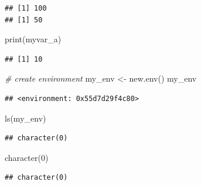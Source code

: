 \documentclass[
]{book}
\newenvironment{Shaded}{\begin{snugshade}}{\end{snugshade}}
\newcommand{\AttributeTok}[1]{\textcolor[rgb]{0.77,0.63,0.00}{#1}}
\newcommand{\CommentTok}[1]{\textcolor[rgb]{0.56,0.35,0.01}{\textit{#1}}}
\newcommand{\DecValTok}[1]{\textcolor[rgb]{0.00,0.00,0.81}{#1}}
\newcommand{\FunctionTok}[1]{\textcolor[rgb]{0.00,0.00,0.00}{#1}}
\newcommand{\NormalTok}[1]{#1}
\newcommand{\OtherTok}[1]{\textcolor[rgb]{0.56,0.35,0.01}{#1}}
\newcommand{\SpecialCharTok}[1]{\textcolor[rgb]{0.00,0.00,0.00}{#1}}
\newcommand{\StringTok}[1]{\textcolor[rgb]{0.31,0.60,0.02}{#1}}
\begin{document}
\begin{verbatim}
## [1] 100
## [1] 50
\end{verbatim}

\begin{Shaded}
\begin{Highlighting}[]
\FunctionTok{print}\NormalTok{(myvar\_a)}
\end{Highlighting}
\end{Shaded}

\begin{verbatim}
## [1] 10
\end{verbatim}

\begin{Shaded}
\begin{Highlighting}[]
\CommentTok{\# create environment}
\NormalTok{my\_env }\OtherTok{\textless{}{-}} \FunctionTok{new.env}\NormalTok{()}
\NormalTok{my\_env}
\end{Highlighting}
\end{Shaded}

\begin{verbatim}
## <environment: 0x55d7d29f4c80>
\end{verbatim}

\begin{Shaded}
\begin{Highlighting}[]
\FunctionTok{ls}\NormalTok{(my\_env)}
\end{Highlighting}
\end{Shaded}

\begin{verbatim}
## character(0)
\end{verbatim}

\begin{Shaded}
\begin{Highlighting}[]
\FunctionTok{character}\NormalTok{(}\DecValTok{0}\NormalTok{)}
\end{Highlighting}
\end{Shaded}

\begin{verbatim}
## character(0)
\end{verbatim}

\begin{Shaded}
\end{Shaded}
\end{document}
